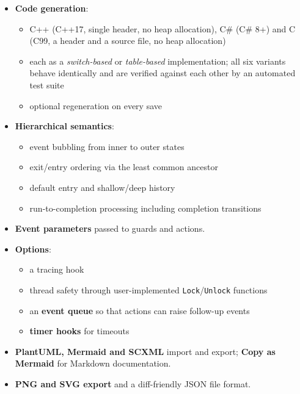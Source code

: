 \documentclass[11pt,a4paper,openany]{report}
\newcommand{\code}[1]{\texttt{#1}}
\begin{document}
\begin{itemize}[itemsep=1pt]
\begin{itemize}[itemsep=0pt]
          \item guard results as check boxes, event arguments and running timers
          \item scenarios that are recorded, saved in the diagram and replayed
          \item transition coverage
        \end{itemize}
  \item \textbf{Code generation}:
        \begin{itemize}[itemsep=0pt]
          \item C++ (C++17, single header, no heap allocation), C\# (C\# 8+) and C (C99, a header
                and a source file, no heap allocation)
          \item each as a \emph{switch-based} or \emph{table-based} implementation; all six variants
                behave identically and are verified against each other by an automated test suite
          \item optional regeneration on every save
        \end{itemize}
  \item \textbf{Hierarchical semantics}:
        \begin{itemize}[itemsep=0pt]
          \item event bubbling from inner to outer states
          \item exit/entry ordering via the least common ancestor
          \item default entry and shallow/deep history
          \item run-to-completion processing including completion transitions
        \end{itemize}
  \item \textbf{Event parameters} passed to guards and actions.
  \item \textbf{Options}:
        \begin{itemize}[itemsep=0pt]
          \item a tracing hook
          \item thread safety through user-implemented \code{Lock}/\code{Unlock} functions
          \item an \textbf{event queue} so that actions can raise follow-up events
          \item \textbf{timer hooks} for timeouts
        \end{itemize}
  \item \textbf{PlantUML, Mermaid and SCXML} import and export; \textbf{Copy as Mermaid} for Markdown documentation.
  \item \textbf{PNG and SVG export} and a diff-friendly JSON file format.
\end{itemize}
\end{document}
